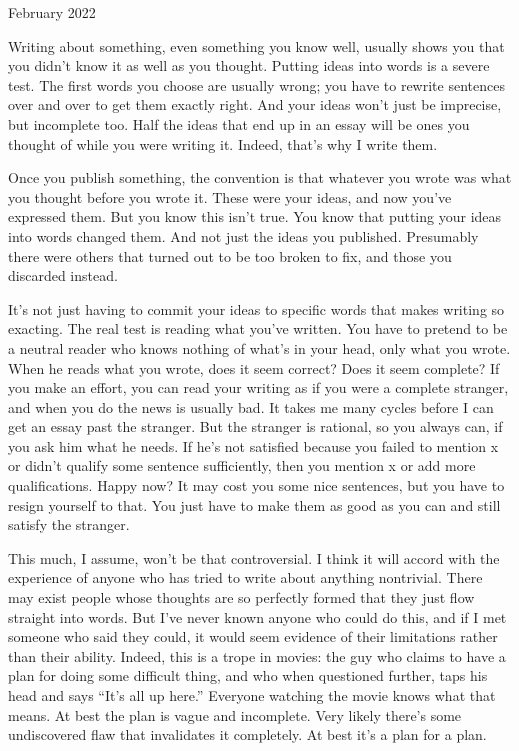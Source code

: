 February 2022

Writing about something, even something you know well, usually shows you
that you didn't know it as well as you thought. Putting ideas into words
is a severe test. The first words you choose are usually wrong; you have
to rewrite sentences over and over to get them exactly right. And your
ideas won't just be imprecise, but incomplete too. Half the ideas that
end up in an essay will be ones you thought of while you were writing
it. Indeed, that's why I write them.

Once you publish something, the convention is that whatever you wrote
was what you thought before you wrote it. These were your ideas, and now
you've expressed them. But you know this isn't true. You know that
putting your ideas into words changed them. And not just the ideas you
published. Presumably there were others that turned out to be too broken
to fix, and those you discarded instead.

It's not just having to commit your ideas to specific words that makes
writing so exacting. The real test is reading what you've written. You
have to pretend to be a neutral reader who knows nothing of what's in
your head, only what you wrote. When he reads what you wrote, does it
seem correct? Does it seem complete? If you make an effort, you can read
your writing as if you were a complete stranger, and when you do the
news is usually bad. It takes me many cycles before I can get an essay
past the stranger. But the stranger is rational, so you always can, if
you ask him what he needs. If he's not satisfied because you failed to
mention x or didn't qualify some sentence sufficiently, then you mention
x or add more qualifications. Happy now? It may cost you some nice
sentences, but you have to resign yourself to that. You just have to
make them as good as you can and still satisfy the stranger.

This much, I assume, won't be that controversial. I think it will accord
with the experience of anyone who has tried to write about anything
nontrivial. There may exist people whose thoughts are so perfectly
formed that they just flow straight into words. But I've never known
anyone who could do this, and if I met someone who said they could, it
would seem evidence of their limitations rather than their ability.
Indeed, this is a trope in movies: the guy who claims to have a plan for
doing some difficult thing, and who when questioned further, taps his
head and says ``It's all up here.'' Everyone watching the movie knows
what that means. At best the plan is vague and incomplete. Very likely
there's some undiscovered flaw that invalidates it completely. At best
it's a plan for a plan.

